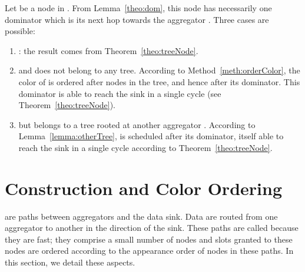 \proof
Let  be a node in . From Lemma~\ref{theo:dom}, this node has necessarily one dominator which is its next hop towards the aggregator . Three cases are possible:
	\begin{enumerate}
	\item : the result comes from Theorem~\ref{theo:treeNode}. 
	\item  and does not belong to any tree. According to Method~\ref{meth:orderColor}, the color of  is ordered after nodes in the tree, and hence after its dominator. This dominator is able to reach the sink in a single cycle (see Theorem~\ref{theo:treeNode}). 
	\item  but belongs to a tree  rooted at another aggregator . According to Lemma~\ref{lemma:otherTree},  is scheduled after its dominator, itself able to reach the sink in a single cycle according to Theorem~\ref{theo:treeNode}.
	\end{enumerate}	
\endproof

\begin{comment}
\begin{theorem}
Given a tree , any node dominated by  is able to reach the aggregator  in one cycle.
\end{theorem}

\proof
Let  any node dominated by . Two case are possible:
\begin{enumerate}
\item If  or , then the theorem is true according to Theorem~\ref{theo:oneCycleTree} and Theorem~\ref{theo:treeNode}.
\item Else, two cases are possible:
	\begin{enumerate}
	\item  does not belong to any tree. This node is colored in  of Method~\ref{meth:orderColor}, that is after all nodes in the tree  including its dominator. Hence the result. 
	\item  belongs to a tree rooted at another aggregator . As proved in Lemma~\ref{lemma:otherTree},  is scheduled before its dominator. Hence the theorem.
	\end{enumerate}
\end{enumerate}
\endproof
\end{comment}

\section{ Construction and Color Ordering}\label{sec:highways}
 are paths between aggregators and the data sink. Data are routed from one aggregator to another in the direction of the sink. These paths are called  because they are fast; they comprise a small number of nodes and slots granted to these nodes are ordered according to the appearance order of nodes in these paths. In this section, we detail these aspects.

